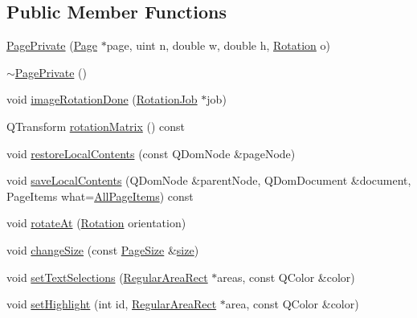 \subsection*{Public Member Functions}
\begin{DoxyCompactItemize}
\item 
\hyperlink{classOkular_1_1PagePrivate_ae3b3400aa6aca064062224157f15553b}{Page\+Private} (\hyperlink{classOkular_1_1Page}{Page} $\ast$page, uint n, double w, double h, \hyperlink{namespaceOkular_a8556d00465f61ef533c6b027669e7da6}{Rotation} o)
\item 
\hyperlink{classOkular_1_1PagePrivate_a0e0c7d2501aa3f7dc8cd1152ff6e9596}{$\sim$\+Page\+Private} ()
\item 
void \hyperlink{classOkular_1_1PagePrivate_a1aebd591ba565c50ab6ea2f8dfa09c28}{image\+Rotation\+Done} (\hyperlink{classOkular_1_1RotationJob}{Rotation\+Job} $\ast$job)
\item 
Q\+Transform \hyperlink{classOkular_1_1PagePrivate_a87e2009afc3a1f31a0b03d3a6a359a03}{rotation\+Matrix} () const 
\item 
void \hyperlink{classOkular_1_1PagePrivate_a422fb3b9ad70e5a94c9c318175697a3a}{restore\+Local\+Contents} (const Q\+Dom\+Node \&page\+Node)
\item 
void \hyperlink{classOkular_1_1PagePrivate_a8685dbd97b4e22eafc9e0c843e2ce26d}{save\+Local\+Contents} (Q\+Dom\+Node \&parent\+Node, Q\+Dom\+Document \&document, Page\+Items what=\hyperlink{namespaceOkular_ad8955fd515cc3f63a14cdff6723e6c1bad157628664d884c59d2cc11bcdddb76a}{All\+Page\+Items}) const 
\item 
void \hyperlink{classOkular_1_1PagePrivate_ac90c04c63cca2e9099a2c3b3c3a83245}{rotate\+At} (\hyperlink{namespaceOkular_a8556d00465f61ef533c6b027669e7da6}{Rotation} orientation)
\item 
void \hyperlink{classOkular_1_1PagePrivate_a4cf8f4ca2b8c0eec25c79aff1a42a876}{change\+Size} (const \hyperlink{classOkular_1_1PageSize}{Page\+Size} \&\hyperlink{synctex__parser_8c_aa23c661441688350614bd6a350d2b6ff}{size})
\item 
void \hyperlink{classOkular_1_1PagePrivate_a4304509f9d6f948920b327a8e75d1985}{set\+Text\+Selections} (\hyperlink{classOkular_1_1RegularAreaRect}{Regular\+Area\+Rect} $\ast$areas, const Q\+Color \&color)
\item 
void \hyperlink{classOkular_1_1PagePrivate_a195f1ab09732096e7d4732b3dcee44b9}{set\+Highlight} (int id, \hyperlink{classOkular_1_1RegularAreaRect}{Regular\+Area\+Rect} $\ast$area, const Q\+Color \&color)
\item 

\end{DoxyCompactItemize}
